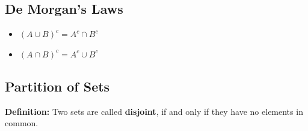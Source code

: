 \documentclass{report}
\begin{document}
    \bigbreak \noindent \bigbreak \noindent 
    \subsection{De Morgan's Laws}
    \bigbreak \noindent 
    \begin{itemize}
        \item $(A \cup B)^{c} = A^{c} \cap B^{c}$
        \item $(A \cap B)^{c} = A^{c} \cup B^{c}$
    \end{itemize}

    \bigbreak \noindent \bigbreak \noindent 
    \subsection{Partition of Sets}
    \bigbreak \noindent 
    \begin{mdframed}
        \textbf{Definition:}
        Two sets are called \textbf{disjoint}, if and only if they have no elements in common.
    \end{mdframed}
    \bigbreak \noindent 





    



    
\end{document}
